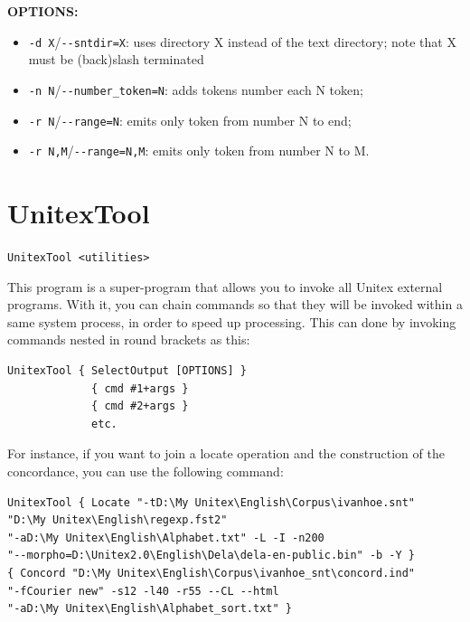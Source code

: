 \bigskip
\noindent \textbf{OPTIONS:}
\begin{itemize}

  \item \verb+-d X+/\verb+--sntdir=X+: uses directory X instead of the text directory; note that X must be (back)slash terminated
  \item \verb+-n N+/\verb+--number_token=N+: adds tokens number each N token;
  \item \verb+-r N+/\verb+--range=N+: emits only token from number N to end;
  \item \verb+-r N,M+/\verb+--range=N,M+: emits only token from number N to M.
\end{itemize}








\section{UnitexTool}
\label{section-UnitexTool}
\verb+UnitexTool <utilities>+

\bigskip
\noindent This program is a super-program that allows you to invoke all Unitex
external programs. With it, you can chain commands so that they will be invoked
within a same system process, in order to speed up processing. This can done by
invoking commands nested in round brackets as this:

\bigskip
\begin{verbatim}
UnitexTool { SelectOutput [OPTIONS] } 
             { cmd #1+args } 
             { cmd #2+args }
             etc.
\end{verbatim}

\bigskip
\noindent For instance, if you want to join a locate operation and the
construction of the concordance, you can use the following command:

\bigskip
\begin{verbatim}
UnitexTool { Locate "-tD:\My Unitex\English\Corpus\ivanhoe.snt" 
"D:\My Unitex\English\regexp.fst2"
"-aD:\My Unitex\English\Alphabet.txt" -L -I -n200 
"--morpho=D:\Unitex2.0\English\Dela\dela-en-public.bin" -b -Y }
{ Concord "D:\My Unitex\English\Corpus\ivanhoe_snt\concord.ind" 
"-fCourier new" -s12 -l40 -r55 --CL --html 
"-aD:\My Unitex\English\Alphabet_sort.txt" }
\end{verbatim}


